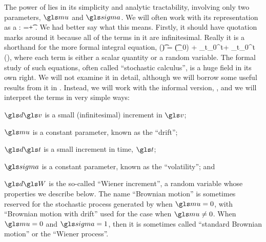 The power of \BM lies in its simplicity and analytic tractability, involving only two parameters, $\gmu$ and $\gsigma$. We will often work with its representation as a \SDE:
\be
\gd\gv=\gmu \gd\t + \gsigma \gd\gW.
\ee
We had better say what this means. Firstly, it should have quotation marks around it because all of the terms in it are infinitesimal. Really it is a shorthand for the more formal integral equation,
\be
\gv(\t) = \gv(\t_0) + \gmu\int_{t_0}^t\gd\gs + \gsigma\int_{t_0}^t \gd\gW(\gs),
\ee
where each term is either a scalar quantity or a random variable. The formal study of such equations, often called ``stochastic calculus'', is a huge field in its own right. We will not examine it in detail, although we will borrow some useful results from it in . Instead, we will work with the informal version, , and we will interpret the terms in very simple ways:
\bi
\item $\gd\gv$ is a small (infinitesimal) increment in $\gv$;
\item $\gmu$ is a constant parameter, known as the ``drift'';
\item $\gd\t$ is a small increment in time, $\t$;
\item $\gsigma$ is a constant parameter, known as the ``volatility''; and
\item $\gd\gW$ is the so-called ``Wiener increment'', a random variable whose properties we describe below.
\ei
The name ``Brownian motion'' is sometimes reserved for the stochastic process generated by  when $\gmu=0$, with ``Brownian motion with drift'' used for the case when $\gmu\neq0$. When $\gmu=0$ and $\gsigma=1$, then it is sometimes called ``standard Brownian motion'' or the ``Wiener process''.

